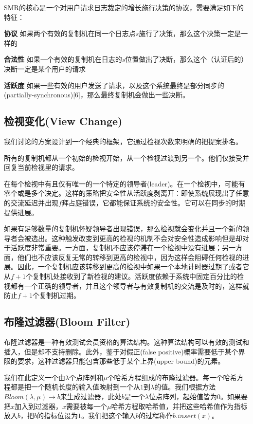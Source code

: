 \documentclass[UTF8]{ctexart}
\begin{document}
SMR的核心是一个对用户请求日志裁定的增长施行决策的协议，需要满足如下的特征：

\textbf{协议} \hspace{3mm} 如果两个有效的复制机在同一个日志点$s$施行了决策，那么这个决策一定是一样的

\textbf{合法性} \hspace{3mm} 如果一个有效的复制机在日志的$s$位置做出了决断，那么这个（认证后的）决断一定是某个用户的请求 

\textbf{活跃度} \hspace{3mm} 如果一些有效的用户发送了请求，以及这个系统最终是部分同步的(partially-synchronous)[6]，那么最终复制机会做出一些决断。

\subsection{检视变化(View Change)}
我们讨论的方案设计到一个经典的框架，它通过检视次数来明确的把提案排名。
 
所有的复制机都从一个初始的检视开始，从一个检视过渡到另一个。他们仅接受并回复当前检视里的请求。

在每个检视中有且仅有唯一的一个特定的领导者(leader)。在一个检视中，可能有零个或是多个决定。这样的策略把安全性从活跃度剥离开：即使系统展现出了任意的交流延迟并出现$f$拜占庭错误，它都能保证系统的安全性。它可以在同步的时期提供进展。

如果有足够数量的复制机怀疑领导者出现错误，那么检视就会变化并且一个新的领导者会被选出。这种触发改变到更高的检视的机制不会对安全性造成影响但是却对于活跃度非常重要。一方面，复制机不应该停滞在一个检视中没有进展；另一方面，他们也不应该反复无常的转移到更高的检视中，因为这样会阻碍任何检视的进展。因此，一个复制机应该转移到更高的检视中如果一个本地计时器过期了或者它从$f+1$个复制机处接收到了新检视的建议。活跃度依赖于系统中固定百分比的检视都有一个正确的领导者，并且这个领导者与有效复制机的交流是及时的，这样就防止$f+1$个复制机过期。



\subsection{布隆过滤器(Bloom Filter)}
布隆过滤器是一种有效测试会员资格的算法结构。这种算法结构可以有效的测试和插入，但是却不支持删除。此外，鉴于对假正(false positive)概率需要低于某个界限的要求，这种过滤器只能包含那些低于某个上界(upper bound)的元素。

我们在此定义一个由$\lambda$个点阵列和$\mu$个哈希方程组成的布隆过滤器。每一个哈希方程都是把一个随机长度的输入值映射到一个从$1$到$\lambda$的值。我们根据方法$Bloom(\lambda, \mu) \to b$来生成过滤器，此处$b$是一个$\lambda$位点阵列，起始值皆为$0$。如果要把$x$加入到过滤器，$x$需要被每一个$\mu$哈希方程取哈希值，并把这些哈希值作为指标放入$b$，把$b$的指标位设为$1$。我们把这个输入$b$的过程称作$b.insert(x)$。
\end{document}

